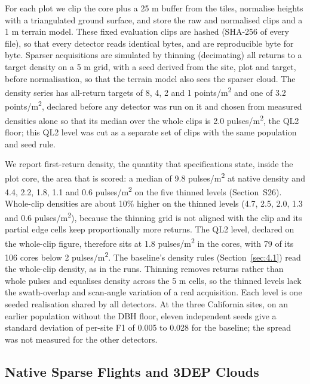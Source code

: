 \documentclass[journal]{IEEEtran}
\begin{document}
For each plot we clip the core plus a 25 m buffer from the tiles, normalise
heights with a triangulated ground surface, and store the raw and normalised
clips and a 1 m terrain model. These fixed evaluation clips are hashed (SHA-256
of every file), so that every detector reads identical bytes, and are
reproducible byte for byte. Sparser acquisitions are simulated by thinning
(decimating) all returns to a target density on a 5 m grid, with a seed derived
from the site, plot and target, before normalisation, so that the terrain model
also sees the sparser cloud. The density series has all-return targets of 8, 4,
2 and 1 points/m\textsuperscript{2} and one of 3.2 points/m\textsuperscript{2}, declared before any detector was run
on it and chosen from measured densities alone so that its median over the whole
clips is 2.0 pulses/m\textsuperscript{2}, the QL2 floor; this QL2 level was cut as a separate set
of clips with the same population and seed rule.

We report first-return density, the quantity that specifications state, inside
the plot core, the area that is scored: a median of 9.8 pulses/m\textsuperscript{2} at native
density and 4.4, 2.2, 1.8, 1.1 and 0.6 pulses/m\textsuperscript{2} on the five thinned levels
(Section~S26). Whole-clip densities are about 10\% higher on the thinned levels
(4.7, 2.5, 2.0, 1.3 and 0.6 pulses/m\textsuperscript{2}), because the thinning grid is not aligned
with the clip and its partial edge cells keep proportionally more returns. The
QL2 level, declared on the whole-clip figure, therefore sits at 1.8 pulses/m\textsuperscript{2} in
the cores, with 79 of its 106 cores below 2 pulses/m\textsuperscript{2}. The baseline's density
rules (Section~\ref{sec:4.1}) read the whole-clip density, as in the runs. Thinning
removes returns rather than whole pulses and equalises density across the 5 m
cells, so the thinned levels lack the swath-overlap and scan-angle variation of
a real acquisition. Each level is one seeded realisation shared by all
detectors. At the three California sites, on an earlier population without the
DBH floor, eleven independent seeds give a standard deviation of per-site F1 of
0.005 to 0.028 for the baseline; the spread was not measured for the other
detectors.

\subsection{Native Sparse Flights and 3DEP Clouds}\label{sec:3.4}
\end{document}
